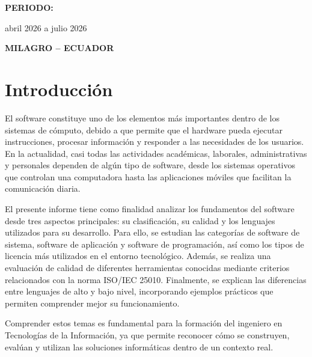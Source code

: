 \documentclass[12pt,a4paper]{article}
\begin{document}
\begin{center}
		\vspace{1cm}
		
		{\fontsize{13}{15}\selectfont\bfseries PERIODO:\par}
		\vspace{0.2cm}
		{\fontsize{13}{15}\selectfont abril 2026 a julio 2026\par}
		
		\vfill
		
		{\fontsize{13}{15}\selectfont\bfseries MILAGRO -- ECUADOR\par}
		
		\vspace*{1cm}
		
	\end{center}
	
	\clearpage
	\thispagestyle{fancy}
	\tableofcontents
	\clearpage
	
	
	\section{Introducción}
	
	El software constituye uno de los elementos más importantes dentro de los sistemas de cómputo, debido a que permite que el hardware pueda ejecutar instrucciones, procesar información y responder a las necesidades de los usuarios. En la actualidad, casi todas las actividades académicas, laborales, administrativas y personales dependen de algún tipo de software, desde los sistemas operativos que controlan una computadora hasta las aplicaciones móviles que facilitan la comunicación diaria.
	
	El presente informe tiene como finalidad analizar los fundamentos del software desde tres aspectos principales: su clasificación, su calidad y los lenguajes utilizados para su desarrollo. Para ello, se estudian las categorías de software de sistema, software de aplicación y software de programación, así como los tipos de licencia más utilizados en el entorno tecnológico. Además, se realiza una evaluación de calidad de diferentes herramientas conocidas mediante criterios relacionados con la norma ISO/IEC 25010. Finalmente, se explican las diferencias entre lenguajes de alto y bajo nivel, incorporando ejemplos prácticos que permiten comprender mejor su funcionamiento.
	
	Comprender estos temas es fundamental para la formación del ingeniero en Tecnologías de la Información, ya que permite reconocer cómo se construyen, evalúan y utilizan las soluciones informáticas dentro de un contexto real.
	
\end{document}
